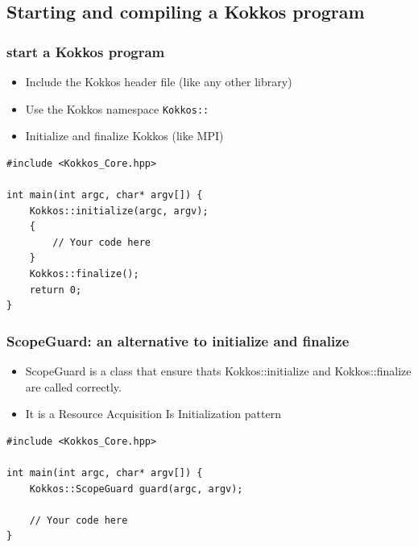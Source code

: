 \documentclass[aspectratio=169]{beamer}
\begin{document}

\subsection[Starting a Kokkos program]{Starting and compiling a Kokkos program}


\begin{frame}[fragile]
    \frametitle{start a Kokkos program} 
    \begin{itemize}
        \item Include the Kokkos header file (like any other library)
        \item Use the Kokkos namespace \texttt{Kokkos::}
        \item Initialize and finalize Kokkos (like MPI)
    \end{itemize}

\begin{verbatim}
#include <Kokkos_Core.hpp>

int main(int argc, char* argv[]) {
    Kokkos::initialize(argc, argv);
    {
        // Your code here
    }
    Kokkos::finalize();
    return 0;
}
\end{verbatim}

\end{frame}


\begin{frame}[fragile]
    \frametitle{ScopeGuard: an alternative to initialize and finalize} 

    \begin{itemize}
        \item ScopeGuard is a class that ensure thats Kokkos::initialize and Kokkos::finalize are called correctly.
        \item It is a Resource Acquisition Is Initialization pattern
    \end{itemize}

\begin{verbatim}
#include <Kokkos_Core.hpp>
    
int main(int argc, char* argv[]) {
    Kokkos::ScopeGuard guard(argc, argv);
        
    // Your code here
}
\end{verbatim}

\end{frame}
\end{document}
